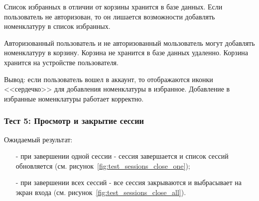 Список избранных в отличии от корзины хранится в базе данных.
Если пользователь не авторизован, то он лишается возможности добавлять номенклатуру в список избранных.

Авторизованный пользователь и не авторизованный мользователь могут добавлять номенклатуру в корзину.
Корзина не хранится в базе данных удаленно. Корзина хранится на устройстве пользователя.

Вывод: если пользователь вошел в аккаунт, то отображаются иконки <<сердечко>> для добавления номенклатуры в избранное.
Добавление в избранные номенклатуры работает корректно.

\subsubsection*{Тест 5: Просмотр и закрытие сессии}

Ожидаемый результат:
\begin{itemize}
    \item[-] при завершении одной сессии - сессия завершается и список сессий обновляется (см. рисунок~\ref{fig:test_sessions_close_one});
    \item[-] при завершении всех сессий - все сессия закрываются и выбрасывает на экран входа (см. рисунок~\ref{fig:test_sessions_close_all}).
\end{itemize}


